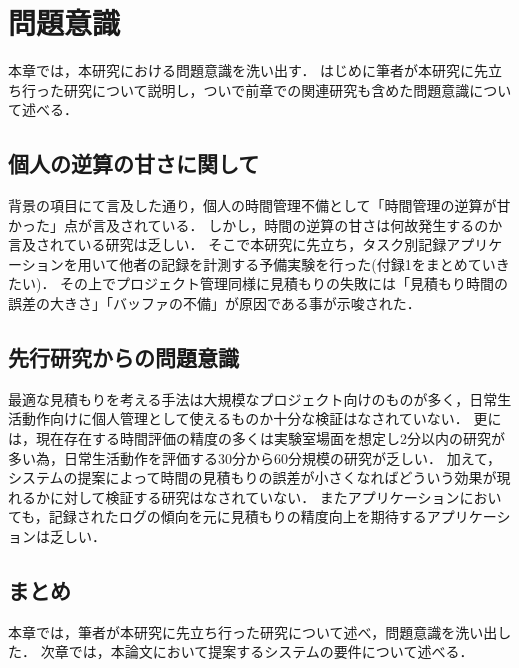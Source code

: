 \chapter{問題意識}
本章では，本研究における問題意識を洗い出す．
はじめに筆者が本研究に先立ち行った研究について説明し，ついで前章での関連研究も含めた問題意識について述べる．

\section{個人の逆算の甘さに関して}
背景の項目にて言及した通り，個人の時間管理不備として「時間管理の逆算が甘かった」点が言及されている．
しかし，時間の逆算の甘さは何故発生するのか言及されている研究は乏しい．
そこで本研究に先立ち，タスク別記録アプリケーションを用いて他者の記録を計測する予備実験を行った(付録1をまとめていきたい)．
その上でプロジェクト管理同様に見積もりの失敗には「見積もり時間の誤差の大きさ」「バッファの不備」が原因である事が示唆された．

\section{先行研究からの問題意識}
最適な見積もりを考える手法は大規模なプロジェクト向けのものが多く，日常生活動作向けに個人管理として使えるものか十分な検証はなされていない．
更には，現在存在する時間評価の精度の多くは実験室場面を想定し2分以内の研究が多い為，日常生活動作を評価する30分から60分規模の研究が乏しい．
加えて，システムの提案によって時間の見積もりの誤差が小さくなればどういう効果が現れるかに対して検証する研究はなされていない．
またアプリケーションにおいても，記録されたログの傾向を元に見積もりの精度向上を期待するアプリケーションは乏しい．

\section{まとめ}
本章では，筆者が本研究に先立ち行った研究について述べ，問題意識を洗い出した．
次章では，本論文において提案するシステムの要件について述べる．